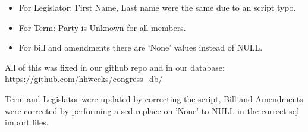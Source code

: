 \documentclass[11pt]{article}
\begin{document}
\begin{itemize}
\item For Legislator: First Name, Last name were the same due to an script typo.

\item For Term: Party is Unknown for all members.

\item For bill and amendments there are ‘None’ values instead of NULL.
\end{itemize}

All of this was fixed in our github repo and in our database: \url{https://github.com/hhweeks/congress_db/}

Term and Legislator were updated by correcting the script, Bill and Amendments were corrected by
performing a sed replace on 'None' to NULL in the correct sql import files.
\end{document}
